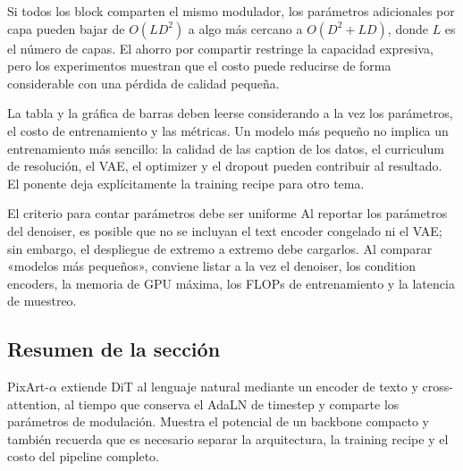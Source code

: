 Si todos los block comparten el mismo modulador, los parámetros adicionales por capa pueden bajar de $O(LD^2)$ a algo más cercano a $O(D^2+LD)$, donde $L$ es el número de capas. El ahorro por compartir restringe la capacidad expresiva, pero los experimentos muestran que el costo puede reducirse de forma considerable con una pérdida de calidad pequeña.


La tabla y la gráfica de barras deben leerse considerando a la vez los parámetros, el costo de entrenamiento y las métricas. Un modelo más pequeño no implica un entrenamiento más sencillo: la calidad de las caption de los datos, el curriculum de resolución, el VAE, el optimizer y el dropout pueden contribuir al resultado. El ponente deja explícitamente la training recipe para otro tema.


\begin{warningbox}{El criterio para contar parámetros debe ser uniforme}
Al reportar los parámetros del denoiser, es posible que no se incluyan el text encoder congelado ni el VAE; sin embargo, el despliegue de extremo a extremo debe cargarlos. Al comparar «modelos más pequeños», conviene listar a la vez el denoiser, los condition encoders, la memoria de GPU máxima, los FLOPs de entrenamiento y la latencia de muestreo.
\end{warningbox}

\subsection{Resumen de la sección}

PixArt-$\alpha$ extiende DiT al lenguaje natural mediante un encoder de texto y cross-attention, al tiempo que conserva el AdaLN de timestep y comparte los parámetros de modulación. Muestra el potencial de un backbone compacto y también recuerda que es necesario separar la arquitectura, la training recipe y el costo del pipeline completo.
